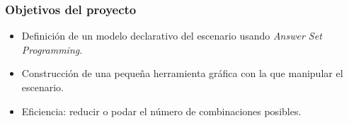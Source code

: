 \begin{frame}
\frametitle{Objetivos del proyecto}

\begin{itemize}
	\item<1-> Definición de un \textcolor{UDCpink}{modelo declarativo} del escenario usando \textcolor{UDCpink}{\itshape Answer Set Programming}.
	
	\vspace{1em}
	
	\item<2-> Construcción de una pequeña \textcolor{UDCpink}{herramienta gráfica} con la que manipular el escenario.
	
	\vspace{1em}
	
	\item<3-> Eficiencia: reducir o podar el número de combinaciones posibles.
\end{itemize}

\end{frame}
